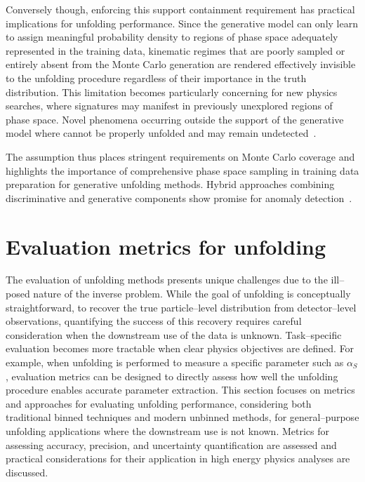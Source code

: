             Conversely though, enforcing this support containment requirement has practical implications for unfolding performance.
            Since the generative model can only learn to assign meaningful probability density to regions of phase space adequately represented in the training data, kinematic regimes that are poorly sampled or entirely absent from the Monte Carlo generation are rendered effectively invisible to the unfolding procedure regardless of their importance in the truth distribution.
            This limitation becomes particularly concerning for new physics searches, where signatures may manifest in previously unexplored regions of phase space.
            Novel phenomena occurring outside the support of the generative model where cannot be properly unfolded and may remain undetected~\cite{Amsler2008MonteTechniques}. 
            
            The assumption thus places stringent requirements on Monte Carlo coverage and highlights the importance of comprehensive phase space sampling in training data preparation for generative unfolding methods.
            Hybrid approaches combining discriminative and generative components show promise for anomaly detection~\cite{DiMattia2019ADetection, Terjek2019AdversarialRegularization}.
\section{Evaluation metrics for unfolding}
    The evaluation of unfolding methods presents unique challenges due to the ill--posed nature of the inverse problem.
    While the goal of unfolding is conceptually straightforward, to recover the true particle--level distribution from detector--level observations, quantifying the success of this recovery requires careful consideration when the downstream use of the data is unknown.
    Task--specific evaluation becomes more tractable when clear physics objectives are defined.
    For example, when unfolding is performed to measure a specific parameter such as \(\alpha_S\), evaluation metrics can be designed to directly assess how well the unfolding procedure enables accurate parameter extraction.
    This section focuses on metrics and approaches for evaluating unfolding performance, considering both traditional binned techniques and modern unbinned methods, for general--purpose unfolding applications where the downstream use is not known.
    Metrics for assessing accuracy, precision, and uncertainty quantification are assessed and practical considerations for their application in high energy physics analyses are discussed.

